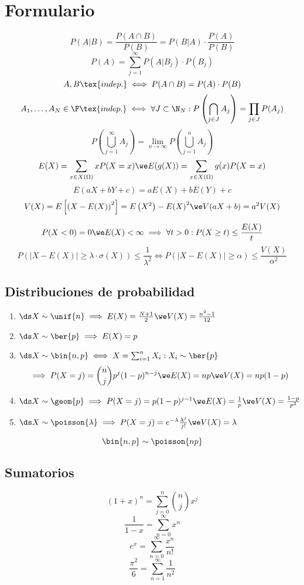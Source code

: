 
\section{Formulario}

\[P(A|B)=\frac{P(A\cap B)}{P(B)}=P(B|A)\cdot\frac{P(A)}{P(B)}\]
\[P(A) = \sum_{j=1}^\infty P(A|B_j)\cdot P(B_j)\]
\[A, B \tex{ indep.} \iff P(A\cap B)=P(A)\cdot P(B)\]
\[A_1, \dots, A_N \in \F\tex{ indep.} \iff \forall J \subset \N_N: P\left(\bigcap_{j\in J} A_j\right)=\prod_{j\in J}P(A_j)\]
\[P\left(\bigcup_{j=1}^\infty A_j\right)=\lim_{n\rightarrow\infty}P\left(\bigcup_{j=1}^n A_j\right)\]
\[E(X)=\sum_{x\in X(\Omega)} x P(X=x) \we E(g(X))=\sum_{x\in X(\Omega)} g(x)P(X=x)\]
\[E(aX+bY+c)=aE(X)+bE(Y)+c\]
\[V(X) = E\left[\left(X-E(X)\right)^2\right] = E\left(X^2\right)-{E(X)}^2 \we V(aX+b)=a^2V(X)\]

\[P(X<0)=0 \we E(X)<\infty \implies \forall t >0 : P(X\geq t) \leq \frac{E(X)}{t}\]
\[P(|X-E(X)|\geq \lambda\cdot \sigma(X)) \leq \frac{1}{\lambda^2} \iff P\left(|X-E(X)|\geq \alpha\right) \leq \frac{V(X)}{\alpha^2}\]
\subsection{Distribuciones de probabilidad}
\begin{enumerate}
	\item $\ds X \sim \unif{n} \implies E(X)=\frac{N+1}{2} \we V(X)=\frac{n^2-1}{12}$
	\item $\ds X \sim \ber{p} \implies E(X)=p$
	\item $\ds X \sim \bin{n, p} \iff X=\sum_{i=1}^n X_i : X_i \sim \ber{p}$
	\[\implies P(X=j) = \binom{n}{j}p^j(1-p)^{n-j} \we E(X)=np \we V(X)=np(1-p)\]
	\item $\ds X \sim \geom{p} \implies P(X=j)=p(1-p)^{j-1} \we E(X)=\frac{1}{p} \we V(X) = \frac{1-p}{p^2}$
	\item $\ds X \sim \poisson{\lambda} \implies P(X=j)=e^{-\lambda}\frac{\lambda^j}{j!} \we V(X)=\lambda$
\end{enumerate}
\[\bin{n, p} \sim \poisson{np}\]
\subsection{Sumatorios}
\[(1+x)^n=\sum_{j=0}^n \binom{n}{j} x^j\]
\[\frac{1}{1-x}=\sum_{n=0}^\infty x^n\]
\[e^x=\sum_{n=0}^\infty \frac{x^n}{n!}\]
\[\frac{\pi^2}{6} = \sum_{n=1}^\infty \frac{1}{n^2}\]
